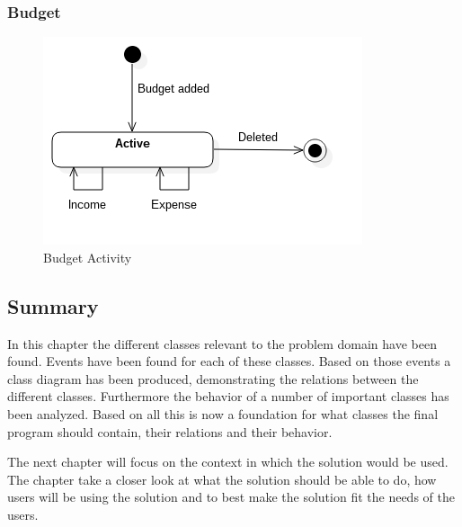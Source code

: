 \subsubsection*{Budget}

\begin{figure}[H]
    \centering
    \includegraphics[scale=0.7]{Images/ProblemDomain/budgetActivityDiagram.png}
    \caption{Budget Activity}
    \label{fig:budgetActivityDiagram}
\end{figure}
















\subsection{Summary}

In this chapter the different classes relevant to the problem domain have been found. Events have been found for each of these classes. 
Based on those events a class diagram has been produced, demonstrating the relations between the different classes. Furthermore the behavior of a number of important classes has been analyzed. Based on all this is now a foundation for what classes the final program should contain, their relations and their behavior.

The next chapter will focus on the context in which the solution would be used. The chapter take a closer look at what the solution should be able to do, how users will be using the solution and to best make the solution fit the needs of the users.














